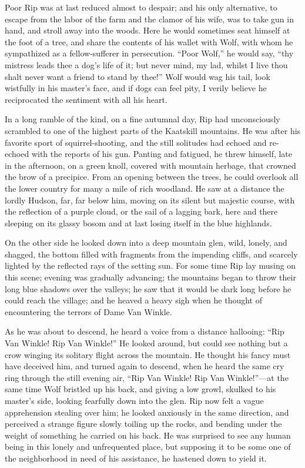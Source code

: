 Poor Rip was at last reduced almost to despair; and his only alternative, to escape from the labor of the farm and the clamor of his wife, was to take gun in hand, and stroll away into the woods. Here he would sometimes seat himself at the foot of a tree, and share the contents of his wallet with Wolf, with whom he sympathized as a fellow-sufferer in persecution. “Poor Wolf,” he would say, “thy mistress leads thee a dog’s life of it; but never mind, my lad, whilst I live thou shalt never want a friend to stand by thee!” Wolf would wag his tail, look wistfully in his master’s face, and if dogs can feel pity, I verily believe he reciprocated the sentiment with all his heart.

In a long ramble of the kind, on a fine autumnal day, Rip had unconsciously scrambled to one of the highest parts of the Kaatskill mountains. He was after his favorite sport of squirrel-shooting, and the still solitudes had echoed and re-echoed with the reports of his gun. Panting and fatigued, he threw himself, late in the afternoon, on a green knoll, covered with mountain herbage, that crowned the brow of a precipice. From an opening between the trees, he could overlook all the lower country for many a mile of rich woodland. He saw at a distance the lordly Hudson, far, far below him, moving on its silent but majestic course, with the reflection of a purple cloud, or the sail of a lagging bark, here and there sleeping on its glassy bosom and at last losing itself in the blue highlands.

On the other side he looked down into a deep mountain glen, wild, lonely, and shagged, the bottom filled with fragments from the impending cliffs, and scarcely lighted by the reflected rays of the setting sun. For some time Rip lay musing on this scene; evening was gradually advancing; the mountains began to throw their long blue shadows over the valleys; he saw that it would be dark long before he could reach the village; and he heaved a heavy sigh when he thought of encountering the terrors of Dame Van Winkle.

As he was about to descend, he heard a voice from a distance hallooing: “Rip Van Winkle! Rip Van Winkle!” He looked around, but could see nothing but a crow winging its solitary flight across the mountain. He thought his fancy must have deceived him, and turned again to descend, when he heard the same cry ring through the still evening air, “Rip Van Winkle! Rip Van Winkle!”—at the same time Wolf bristled up his back, and giving a low growl, skulked to his master’s side, looking fearfully down into the glen. Rip now felt a vague apprehension stealing over him; he looked anxiously in the same direction, and perceived a strange figure slowly toiling up the rocks, and bending under the weight of something he carried on his back. He was surprised to see any human being in this lonely and unfrequented place, but supposing it to be some one of the neighborhood in need of his assistance, he hastened down to yield it.

